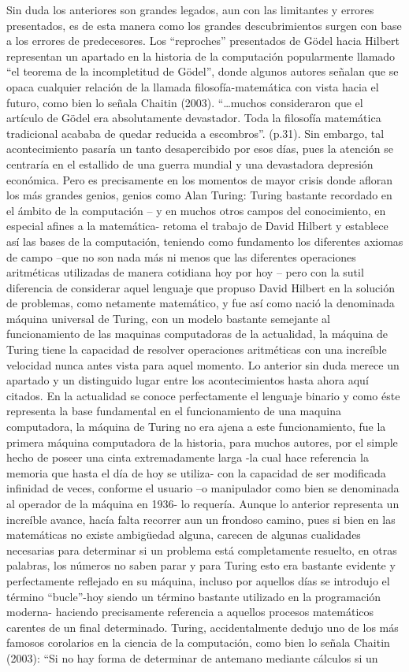 \documentclass{article}
\begin{document}
Sin duda los anteriores son grandes legados, aun con las limitantes y errores presentados, es de esta manera como los grandes descubrimientos surgen con base a los errores de predecesores. Los “reproches” presentados de Gödel hacia Hilbert representan un apartado en la historia de la computación popularmente llamado “el teorema de la incompletitud de Gödel”, donde algunos autores señalan que se opaca cualquier relación de la llamada filosofía-matemática con vista hacia el futuro, como bien lo señala Chaitin (2003). “…muchos consideraron que el artículo de Gödel era absolutamente devastador. Toda la filosofía matemática tradicional acababa de quedar reducida a escombros”. (p.31).  Sin embargo, tal acontecimiento pasaría un tanto desapercibido por esos días, pues la atención se centraría en el estallido de una guerra mundial y una devastadora depresión económica. Pero es precisamente en los momentos de mayor crisis donde afloran los más grandes genios, genios como Alan Turing: Turing bastante recordado en el ámbito de la computación – y en muchos otros campos del conocimiento, en especial afines a la matemática-  retoma el trabajo de David Hilbert y establece así las bases de la computación, teniendo como fundamento los diferentes axiomas de campo –que no son nada más ni menos que las diferentes operaciones aritméticas utilizadas de manera cotidiana hoy por hoy – pero con la sutil diferencia de considerar aquel lenguaje que propuso David Hilbert en la solución de problemas, como netamente matemático, y fue así como nació la denominada máquina universal de Turing, con un modelo bastante semejante al funcionamiento de las maquinas computadoras de la actualidad, la máquina de Turing tiene la capacidad de resolver operaciones aritméticas con una increíble velocidad nunca antes vista para aquel momento. Lo anterior sin duda merece un apartado y un distinguido lugar entre los acontecimientos hasta ahora aquí citados. En la actualidad se conoce perfectamente el lenguaje binario y como éste representa la base fundamental en el funcionamiento de una maquina computadora, la máquina de Turing no era ajena a este funcionamiento, fue la primera máquina computadora de la historia, para muchos autores, por el simple hecho de poseer una cinta extremadamente larga  -la cual hace referencia la memoria que hasta el día de hoy se utiliza-  con la capacidad de ser modificada infinidad de veces, conforme el usuario –o manipulador como bien se denominada al operador de la máquina en 1936-  lo requería. Aunque lo anterior representa un increíble avance, hacía falta recorrer aun un frondoso camino, pues si bien en las matemáticas no existe ambigüedad alguna, carecen de algunas cualidades necesarias para determinar si un problema está completamente resuelto, en otras palabras, los números no saben parar y para Turing esto era bastante evidente y perfectamente reflejado en su máquina, incluso por aquellos días se introdujo el término “bucle”-hoy siendo un término bastante utilizado en la programación moderna- haciendo precisamente referencia a aquellos procesos matemáticos carentes de un final determinado. Turing, accidentalmente dedujo uno de los más famosos corolarios en la ciencia de la computación, como bien lo señala Chaitin (2003): “Si no hay forma de determinar de antemano mediante cálculos si un 
\end{document}
